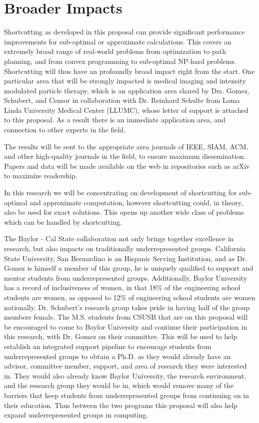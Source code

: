 \section{Broader Impacts}

Shortcutting as developed in this proposal can provide significant performance improvements for sub-optimal or approximate calculations.  This covers an extremely broad range of real-world problems from optimization to path planning, and from convex programming to sub-optimal NP-hard problems.  Shortcutting will thus have an profoundly broad impact right from the start. One particular area that will be strongly impacted is medical imaging and intensity modulated particle therapy, which is an application area shared by Drs. Gomez, Schubert, and Censor in collaboration with Dr. Reinhard Schulte from Loma Linda University Medical Center (LLUMC), whose letter of support is attached to this proposal.  As a result there is an immediate application area, and connection to other experts in the field.

The results will be sent to the appropriate area journals of IEEE, SIAM, ACM, and other high-quality journals in the field, to ensure maximum dissemination.  Papers and data will be made available on the web in repositories such as arXiv to maximize readership.

In this research we will be concentrating on development of shortcutting for sub-optimal and approximate computation, however shortcutting could, in theory, also be used for exact solutions.  This opens up another wide class of problems which can be handled by shortcutting.


The Baylor - Cal State collaboration not only brings together excellence in research, but also impacts on traditionally underrepresented groups.  California State University, San Bernardino is an Hispanic Serving Institution, and as Dr. Gomez is himself a member of this group, he is uniquely qualified to support and mentor students from underrepresented groups.  Additionally, Baylor University has a record of inclusiveness of women, in that 18\% of the engineering school students are women, as opposed to 12\% of engineering school students are women nationally.  Dr. Schubert's research group takes pride in having half of the group members female.  The M.S. students from CSUSB that are on this proposal will be encouraged to come to Baylor University and continue their participation in this research, with Dr. Gomez on their committee.  This will be used to help establish an integrated support pipeline to encourage students from underrepresented groups to obtain a Ph.D. as they would already have an advisor, committee member, support, and area of research they were interested in.  They would also already know Baylor University, the research environment, and the research group they would be in, which would remove many of the barriers that keep students from underrepresented groups from continuing on in their education.  Thus between the two programs this proposal will also help expand underrepresented groups in computing.
